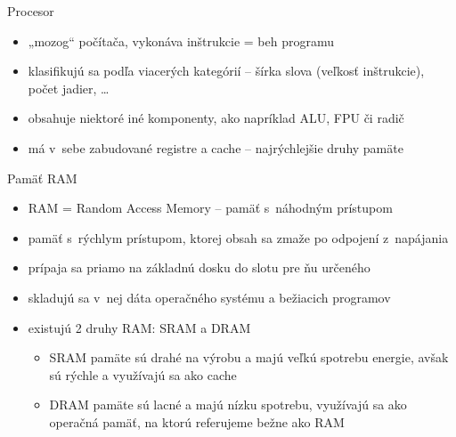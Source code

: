 \documentclass[pdf,fyma]{prosper}
\providecommand{\uv}[1]{„#1“}
\begin{document}
\begin{slide}{Procesor}
\begin{itemize}
\item \uv{mozog} počítača, vykonáva inštrukcie = beh programu
\item klasifikujú sa podľa viacerých kategórií -- šírka slova (veľkosť inštrukcie), počet jadier, \dots 
\item obsahuje niektoré iné komponenty, ako napríklad ALU, FPU či radič
\item má v~sebe zabudované registre a cache -- najrýchlejšie druhy pamäte
\end{itemize}
\begin{figure}[ht]
  \begin{center}
  \label{cpu}
  \end{center}
\end{figure}
\end{slide}

\begin{slide}{Pamäť RAM}
\begin{itemize}
\item RAM = Random Access Memory -- pamäť s~náhodným prístupom
\item pamäť s~rýchlym prístupom, ktorej obsah sa zmaže po odpojení z~napájania
\item prípaja sa priamo na základnú dosku do slotu pre ňu určeného
\item skladujú sa v~nej dáta operačného systému a bežiacich programov
\item existujú 2 druhy RAM: SRAM a DRAM
\begin{itemize}
\item SRAM pamäte sú drahé na výrobu a majú veľkú spotrebu energie, avšak sú rýchle a využívajú sa ako cache
\item DRAM pamäte sú lacné a majú nízku spotrebu, využívajú sa ako operačná pamäť, na ktorú referujeme bežne ako RAM
\end{itemize}
\end{itemize}
\end{slide}
\end{document}
